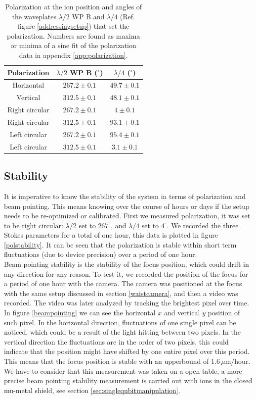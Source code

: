 \begin{table}
\centering
\begin{tabular}{c c c}
 \toprule
    {Polarization} & {$\lambda/2$ WP B ($^\circ$)} & {$\lambda/4$ ($^\circ$)} \\ \midrule\midrule
   Horizontal & $267.2\pm 0.1$ & $49.7\pm0.1$  \\
   Vertical   & $312.5\pm0.1$ & $48.1\pm0.1$\\ \midrule
   Right circular & $267.2\pm 0.1$ & $4\pm 0.1$ \\
   Right circular & $312.5\pm0.1$ & $93.1\pm0.1$\\\midrule
  Left circular & $267.2\pm 0.1$ & $95.4\pm0.1$\\
    Left circular & $312.5\pm0.1$  & $3.1\pm0.1$\\ \bottomrule
\end{tabular}
\caption{Polarization at the ion position and angles of the waveplates $\lambda/2$ WP B and $\lambda/4$ (Ref. figure \ref{addressingsetup}) that set the polarization. Numbers are found as maxima or minima of a sine fit of the polarization data in appendix \ref{app:polarization}.}
\label{polarizationstable}
\end{table}

\subsection{Stability}
\label{sec:stability}
It is imperative to know the stability of the system in terms of polarization and beam pointing. This means knowing over the course of hours or days if the setup needs to be re-optimized or calibrated. First we measured polarization, it was set to be right circular: $\lambda/2$ set to $267^\circ$, and $\lambda/4$ set to $4^\circ$. We recorded the three Stokes parameters for a total of one hour, this data is plotted in figure \ref{polstability}. It can be seen that the polarization is stable within short term fluctuations (due to device precision) over a period of one hour.\\
Beam pointing stability is the stability of the focus position, which could drift in any direction for any reason. To test it, we recorded the position of the focus for a period of one hour with the camera. The camera was positioned at the focus with the same setup discussed in section \ref{waistcamera}, and then a video was recorded. The video was later analyzed by tracking the brightest pixel over time. In figure \ref{beampointing} we can see the horizontal $x$ and vertical $y$ position of such pixel. In the horizontal direction, fluctuations of one single pixel can be noticed, which could be a result of the light hitting between two pixels. In the vertical direction the fluctuations are in the order of two pixels, this could indicate that the position might have shifted by one entire pixel over this period. This means that the focus position is stable with an upperbound of $1.6\,\mu$m/hour. We have to consider that this measurement was taken on a open table, a more precise beam pointing stability measurement is carried out with ions in the closed mu-metal shield, see section \ref{sec:singlequbitmanipulation}.

